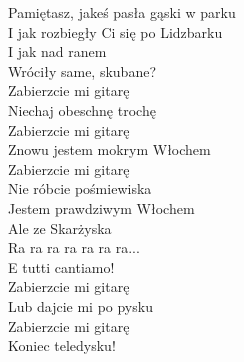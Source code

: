 \begin{text}
Pamiętasz, jakeś pasła gąski w parku\\
I jak rozbiegły Ci się po Lidzbarku\\
I jak nad ranem\\
Wróciły same, skubane?\\

Zabierzcie mi gitarę\\
Niechaj obeschnę trochę\\
Zabierzcie mi gitarę\\
Znowu jestem mokrym Włochem\\

Zabierzcie mi gitarę\\
Nie róbcie pośmiewiska\\
Jestem prawdziwym Włochem\\
Ale ze Skarżyska\\

Ra ra ra ra ra ra ra...\\
E tutti cantiamo!\\

Zabierzcie mi gitarę\\
Lub dajcie mi po pysku\\
Zabierzcie mi gitarę\\
Koniec teledysku!\\
\end{text}
